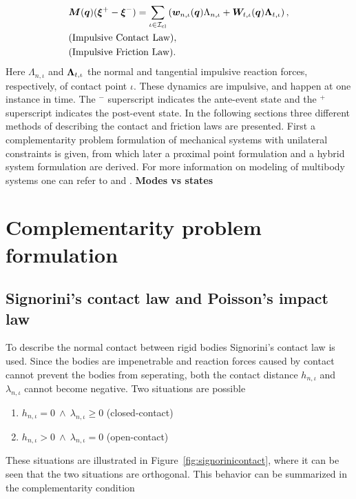 \documentclass[../DC2017114Bouma.tex]{subfiles}
\begin{document}
\begin{align}
&{\boldsymbol{M}}({\boldsymbol{q}})(\boldsymbol{\xi}^+ - \boldsymbol{\xi}^-) = \sum_{\iota\in\mathcal{I}_{\text{cl}}}\left( {\boldsymbol{w}}_{n,\iota}({\boldsymbol{q}})\Lambda_{n,\iota} + {\boldsymbol{W}}_{t,\iota}({\boldsymbol{q}})\boldsymbol{\Lambda}_{t,\iota}\right), \label{eq:appimp1}\\
&\text{(Impulsive Contact Law)},\label{eq:appimp2}\\
&\text{(Impulsive Friction Law)}.\label{eq:appimp3}
\end{align}
Here $\Lambda_{n,\iota}$ and $\boldsymbol{\Lambda}_{t,\iota}$ the normal and tangential impulsive reaction forces, respectively, of contact point $\iota$. These dynamics are impulsive, and happen at one instance in time. The $^-$ superscript indicates the ante-event state and the $^+$ superscript indicates the post-event state. In the following sections three different methods of describing the contact and friction laws are presented. First a complementarity problem formulation of mechanical systems with unilateral constraints is given, from which later a proximal point formulation and a hybrid system formulation are derived. For more information on modeling of multibody systems one can refer to \cite{Leine2008} and \cite{Wouw2016}. \textbf{Modes vs states}

\section{Complementarity problem formulation}\label{sec:comp}
\subsection{Signorini's contact law and Poisson's impact law}
To describe the normal contact between rigid bodies Signorini's contact law is used. Since the bodies are impenetrable and reaction forces caused by contact cannot prevent the bodies from seperating, both the contact distance $h_{n,\iota}$ and $\lambda_{n,\iota}$ cannot become negative. Two situations are possible

\begin{enumerate}
\item $h_{n,\iota}=0\ \wedge\ \lambda_{n,\iota} \geq 0$ (closed-contact)
\item $h_{n,\iota}>0\ \wedge\ \lambda_{n,\iota} = 0$ (open-contact)
\end{enumerate}

These situations are illustrated in Figure~\ref{fig:signorinicontact}, where it can be seen that the two situations are orthogonal. This behavior can be summarized in the complementarity condition
\end{document}
